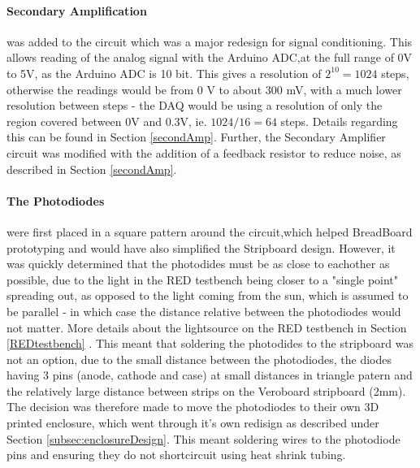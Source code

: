 \paragraph{Secondary Amplification} was added to the circuit which was a major redesign for signal conditioning. This allows reading of the analog signal with the Arduino \ac{ADC},at the full range of 0V to 5V, as the Arduino \ac{ADC} is 10 bit. This gives a resolution of  $2^{10}=1024$ steps, otherwise the readings would be from 0 V to about 300 mV, with a much lower resolution between steps - the DAQ would be using a resolution of only the region covered between 0V and 0.3V, ie. $1024/16=64$ steps. Details regarding this can be found in Section \ref{secondAmp}. Further, the Secondary Amplifier circuit was modified with the addition of a feedback resistor to reduce noise, as described in Section \ref{secondAmp}.
\paragraph{The Photodiodes} were first placed in a square pattern around the circuit,which helped BreadBoard prototyping and would have also simplified the Stripboard design. However, it was quickly determined that the photodides must be as close to eachother as possible, due to the light in the \ac{RED} testbench being closer to a "single point" spreading out, as opposed to the light coming from the sun, which is assumed to be parallel - in which case the distance relative between the photodiodes would not matter. More details about the lightsource on the \ac{RED} testbench in Section \ref{REDtestbench} . This meant that soldering the photodides to the stripboard was not an option, due to the small distance between the photodiodes, the diodes having 3 pins (anode, cathode and case) at small distances in triangle patern and the relatively large distance between strips on the Veroboard stripboard (2mm). The decision was therefore made to move the photodiodes to their own 3D printed enclosure, which went through it's own redisign as described under Section \ref{subsec:enclosureDesign}. This meant soldering wires to the photodiode pins and ensuring they do not shortcircuit using heat shrink tubing.
\vspace{1em}

